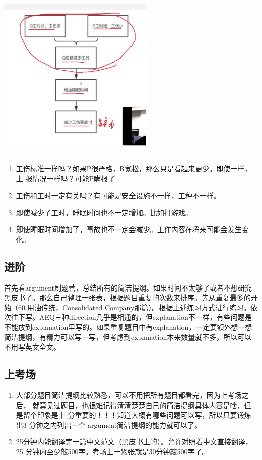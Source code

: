 \documentclass[cn,plain]{elegantbookex}
\begin{document}
\begin{center}
\includegraphics[width=2.925in,height=3.28443in]{image1.jpg}
\end{center}

\begin{enumerate}
    \item 工伤标准一样吗？如果P很严格，B宽松，那么只是看起来更少。即使一样，上
    报情况一样吗？可能P瞒报了
    \item 工伤和工时一定有关吗？有可能是安全设施不一样，工种不一样。
    \item 即使减少了工时，睡眠时间也不一定增加。比如打游戏。
    \item 即使睡眠时间增加了，事故也不一定会减少。工作内容在将来可能会发生变化。
\end{enumerate}

\subsection{进阶}
首先看argument刷题营，总结所有的简洁提纲。如果时间不太够了或者不想研究黑皮书了。那么自己整理一张表，根据题目重复的次数来排序。先从重复最多的开始（60.用油传统，Consolidated
Company那篇）。根据上述练习方式进行练习。依次往下写。AEQ三种direction几乎是相通的，但explanation不一样，有些问题是不能放到explanation里写的。如果重复题目中有explanation，一定要额外想一想简洁提纲，有精力可以写一写，但考虑到explanation本来数量就不多，所以可以不用写英文全文。

\subsection{上考场}
\begin{enumerate}
    \item 大部分题目简洁提纲比较熟悉，可以不用把所有题目都看完，因为上考场之后，
    就算见过题目，也很难记得清清楚楚自己的简洁提纲具体内容是啥，但是留个印象是十
    分重要的！！！知道大概有哪些问题可以写，所以只要锻炼出3 分钟之内列出一个
    argument简洁提纲的能力就可以了。
    \item 25分钟内能翻译完一篇中文范文（黑皮书上的）。允许对照着中文直接翻译，25
    分钟内至少敲500字。考场上一紧张就是30分钟敲500字了。
\end{enumerate}
\end{document}
